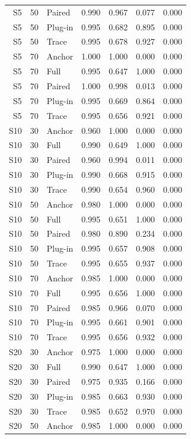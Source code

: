 \begin{longtable}{rrlrrrr}
S5 & 50 & Paired & 0.990 & 0.967 & 0.077 & 0.000\\
S5 & 50 & Plug-in & 0.995 & 0.682 & 0.895 & 0.000\\
S5 & 50 & Trace & 0.995 & 0.678 & 0.927 & 0.000\\
S5 & 70 & Anchor & 1.000 & 1.000 & 0.000 & 0.000\\
S5 & 70 & Full & 0.995 & 0.647 & 1.000 & 0.000\\
S5 & 70 & Paired & 1.000 & 0.998 & 0.013 & 0.000\\
S5 & 70 & Plug-in & 0.995 & 0.669 & 0.864 & 0.000\\
S5 & 70 & Trace & 0.995 & 0.656 & 0.921 & 0.000\\
S10 & 30 & Anchor & 0.960 & 1.000 & 0.000 & 0.000\\
S10 & 30 & Full & 0.990 & 0.649 & 1.000 & 0.000\\
S10 & 30 & Paired & 0.960 & 0.994 & 0.011 & 0.000\\
S10 & 30 & Plug-in & 0.990 & 0.668 & 0.915 & 0.000\\
S10 & 30 & Trace & 0.990 & 0.654 & 0.960 & 0.000\\
S10 & 50 & Anchor & 0.980 & 1.000 & 0.000 & 0.000\\
S10 & 50 & Full & 0.995 & 0.651 & 1.000 & 0.000\\
S10 & 50 & Paired & 0.980 & 0.890 & 0.234 & 0.000\\
S10 & 50 & Plug-in & 0.995 & 0.657 & 0.908 & 0.000\\
S10 & 50 & Trace & 0.995 & 0.655 & 0.937 & 0.000\\
S10 & 70 & Anchor & 0.985 & 1.000 & 0.000 & 0.000\\
S10 & 70 & Full & 0.995 & 0.656 & 1.000 & 0.000\\
S10 & 70 & Paired & 0.985 & 0.966 & 0.070 & 0.000\\
S10 & 70 & Plug-in & 0.995 & 0.661 & 0.901 & 0.000\\
S10 & 70 & Trace & 0.995 & 0.656 & 0.932 & 0.000\\
S20 & 30 & Anchor & 0.975 & 1.000 & 0.000 & 0.000\\
S20 & 30 & Full & 0.990 & 0.647 & 1.000 & 0.000\\
S20 & 30 & Paired & 0.975 & 0.935 & 0.166 & 0.000\\
S20 & 30 & Plug-in & 0.985 & 0.663 & 0.930 & 0.000\\
S20 & 30 & Trace & 0.985 & 0.652 & 0.970 & 0.000\\
S20 & 50 & Anchor & 0.985 & 1.000 & 0.000 & 0.000\\

\end{longtable}
